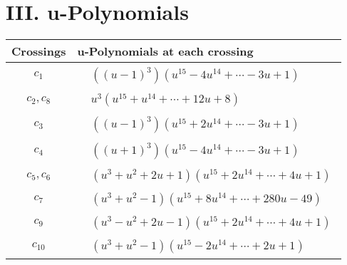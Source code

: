 \documentclass[1p]{elsarticle_modified}
\theoremstyle{definition}
\begin{document}
\newpage\renewcommand{\arraystretch}{1}
\centering \section*{ III. u-Polynomials}
\begin{tabular}{m{50pt}|m{274pt}}
Crossings & \hspace{64pt}u-Polynomials at each crossing \\
\hline $$\begin{aligned}c_{1}\end{aligned}$$&$\begin{aligned}
&((u-1)^3)(u^{15}-4 u^{14}+\cdots-3 u+1)
\end{aligned}$\\
\hline $$\begin{aligned}c_{2},c_{8}\end{aligned}$$&$\begin{aligned}
&u^3(u^{15}+u^{14}+\cdots+12 u+8)
\end{aligned}$\\
\hline $$\begin{aligned}c_{3}\end{aligned}$$&$\begin{aligned}
&((u-1)^3)(u^{15}+2 u^{14}+\cdots-3 u+1)
\end{aligned}$\\
\hline $$\begin{aligned}c_{4}\end{aligned}$$&$\begin{aligned}
&((u+1)^3)(u^{15}-4 u^{14}+\cdots-3 u+1)
\end{aligned}$\\
\hline $$\begin{aligned}c_{5},c_{6}\end{aligned}$$&$\begin{aligned}
&(u^3+u^2+2 u+1)(u^{15}+2 u^{14}+\cdots+4 u+1)
\end{aligned}$\\
\hline $$\begin{aligned}c_{7}\end{aligned}$$&$\begin{aligned}
&(u^3+u^2-1)(u^{15}+8 u^{14}+\cdots+280 u-49)
\end{aligned}$\\
\hline $$\begin{aligned}c_{9}\end{aligned}$$&$\begin{aligned}
&(u^3- u^2+2 u-1)(u^{15}+2 u^{14}+\cdots+4 u+1)
\end{aligned}$\\
\hline $$\begin{aligned}c_{10}\end{aligned}$$&$\begin{aligned}
&(u^3+u^2-1)(u^{15}-2 u^{14}+\cdots+2 u+1)
\end{aligned}$\\
\hline
\end{tabular}\newpage\renewcommand{\arraystretch}{1}
\end{document}
